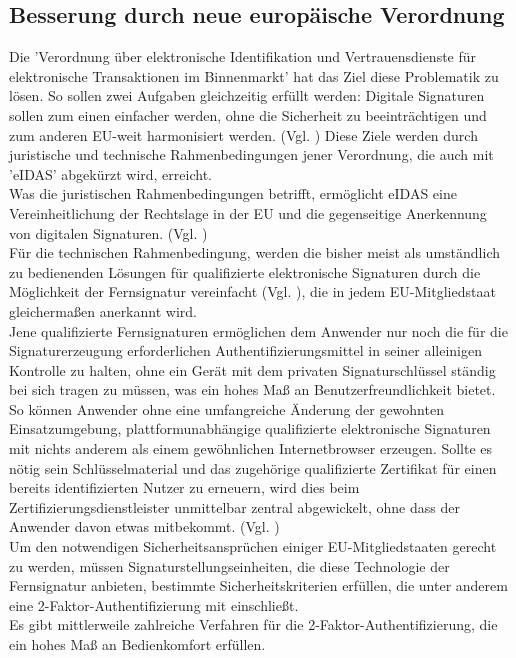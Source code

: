 \documentclass[deutsch]{lib/llncs/llncs}
\begin{document}
\subsection{Besserung durch neue europäische Verordnung}
Die 'Verordnung über elektronische Identifikation und Vertrauensdienste für elektronische Transaktionen im Binnenmarkt' hat das Ziel diese Problematik zu lösen. So sollen zwei Aufgaben gleichzeitig erfüllt werden: Digitale Signaturen sollen zum einen einfacher werden, ohne die Sicherheit zu beeinträchtigen und zum anderen EU-weit harmonisiert werden. (Vgl. \cite[S. 33]{Zitat08}) Diese Ziele werden durch juristische und technische Rahmenbedingungen jener Verordnung, die auch mit 'eIDAS' abgekürzt wird, erreicht. \\
Was die juristischen Rahmenbedingungen betrifft, ermöglicht eIDAS eine Vereinheitlichung der Rechtslage in der EU und die gegenseitige Anerkennung von digitalen Signaturen. (Vgl. \cite[S. 33]{Zitat08}) \\
Für die technischen Rahmenbedingung, werden die bisher meist als umständlich zu bedienenden Lösungen für qualifizierte elektronische Signaturen durch die Möglichkeit der Fernsignatur vereinfacht (Vgl. \cite[S. 30]{Zitat08}), die in jedem EU-Mitgliedstaat gleichermaßen anerkannt wird. \\
Jene qualifizierte Fernsignaturen ermöglichen dem Anwender nur noch die für die Signaturerzeugung erforderlichen Authentifizierungsmittel in seiner alleinigen Kontrolle zu halten, ohne ein Gerät mit dem privaten Signaturschlüssel ständig bei sich tragen zu müssen, was ein hohes Maß an Benutzerfreundlichkeit bietet. So können Anwender ohne eine umfangreiche Änderung der gewohnten Einsatzumgebung, plattformunabhängige qualifizierte elektronische Signaturen mit nichts anderem als einem gewöhnlichen Internetbrowser erzeugen.  Sollte es nötig sein Schlüsselmaterial und das zugehörige qualifizierte Zertifikat für einen bereits identifizierten Nutzer zu erneuern, wird dies beim Zertifizierungsdienstleister unmittelbar zentral abgewickelt, ohne dass der Anwender davon etwas mitbekommt. (Vgl. \cite[S. 233-234]{Zitat09})\\
Um den notwendigen Sicherheitsansprüchen einiger EU-Mitgliedstaaten gerecht zu werden, müssen Signaturstellungseinheiten, die diese Technologie der Fernsignatur anbieten, bestimmte Sicherheitskriterien erfüllen, die unter anderem eine 2-Faktor-Authentifizierung mit einschließt. \\
Es gibt mittlerweile zahlreiche Verfahren für die 2-Faktor-Authentifizierung, die ein hohes Maß an Bedienkomfort erfüllen. \\
\end{document}
